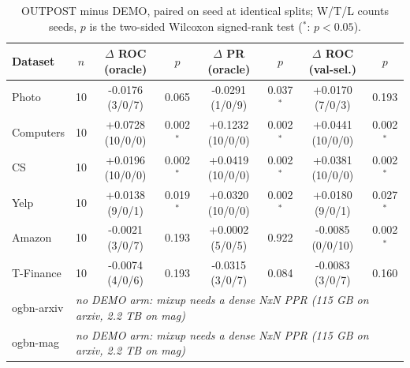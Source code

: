 \begin{table}[t]
\centering
\small
\begin{tabular}{lccccccc}
\toprule
Dataset & $n$ & $\Delta$ ROC (oracle) & $p$ & $\Delta$ PR (oracle) & $p$ & $\Delta$ ROC (val-sel.) & $p$ \\
\midrule
Photo & 10 & -0.0176 (3/0/7) & 0.065 & -0.0291 (1/0/9) & 0.037$^{*}$ & +0.0170 (7/0/3) & 0.193 \\
Computers & 10 & +0.0728 (10/0/0) & 0.002$^{*}$ & +0.1232 (10/0/0) & 0.002$^{*}$ & +0.0441 (10/0/0) & 0.002$^{*}$ \\
CS & 10 & +0.0196 (10/0/0) & 0.002$^{*}$ & +0.0419 (10/0/0) & 0.002$^{*}$ & +0.0381 (10/0/0) & 0.002$^{*}$ \\
Yelp & 10 & +0.0138 (9/0/1) & 0.019$^{*}$ & +0.0320 (10/0/0) & 0.002$^{*}$ & +0.0180 (9/0/1) & 0.027$^{*}$ \\
Amazon & 10 & -0.0021 (3/0/7) & 0.193 & +0.0002 (5/0/5) & 0.922 & -0.0085 (0/0/10) & 0.002$^{*}$ \\
T-Finance & 10 & -0.0074 (4/0/6) & 0.193 & -0.0315 (3/0/7) & 0.084 & -0.0083 (3/0/7) & 0.160 \\
ogbn-arxiv & \multicolumn{7}{l}{\emph{no DEMO arm: mixup needs a dense NxN PPR (115 GB on arxiv, 2.2 TB on mag)}} \\
ogbn-mag & \multicolumn{7}{l}{\emph{no DEMO arm: mixup needs a dense NxN PPR (115 GB on arxiv, 2.2 TB on mag)}} \\
\bottomrule
\end{tabular}
\caption{OUTPOST minus DEMO, paired on seed at identical splits; W/T/L counts seeds, $p$ is the two-sided Wilcoxon signed-rank test ($^{*}$: $p<0.05$).}
\label{tab:paired_demo}
\end{table}
